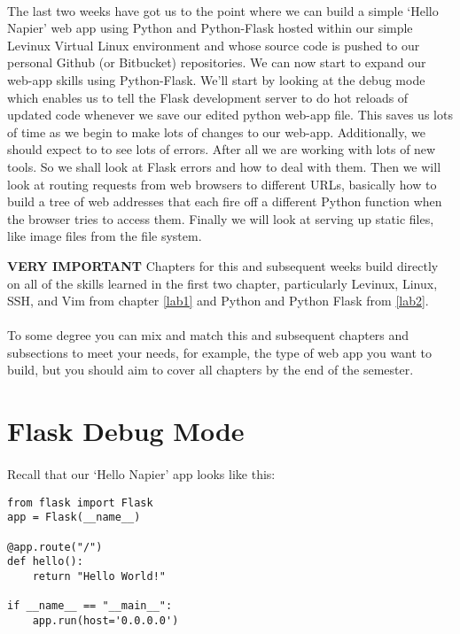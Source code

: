 \documentclass[12pt, a4paper, twoside]{book}
\begin{document}
\paragraph{} The last two weeks have got us to the point where we can build a simple `Hello Napier' web app using Python and Python-Flask hosted within our simple Levinux Virtual Linux environment and whose source code is pushed to our personal Github (or Bitbucket) repositories. We can now start to expand our web-app skills using Python-Flask. We'll start by looking at the debug mode which enables us to tell the Flask development server to do hot reloads of updated code whenever we save our edited python web-app file. This saves us lots of time as we begin to make lots of changes to our web-app. Additionally, we should expect to to see lots of errors. After all we are working with lots of new tools. So we shall look at Flask errors and how to deal with them. Then we will look at routing requests from web browsers to different URLs, basically how to build a tree of web addresses that each fire off a different Python function when the browser tries to access them. Finally we will look at serving up static files, like image files from the file system.

\begin{framed}
\textbf{VERY IMPORTANT} Chapters for this and subsequent weeks build directly on all of the skills learned in the first two chapter, particularly Levinux, Linux, SSH, and Vim from chapter \ref{lab1} and Python and Python Flask from \ref{lab2}.

\paragraph{} To some degree you can mix and match this and subsequent chapters and subsections to meet your needs, for example, the type of web app you want to build, but you should aim to cover all chapters by the end of the semester.
\end{framed}

\section{Flask Debug Mode}
\label{debug}
\paragraph{} Recall that our `Hello Napier' app looks like this:

\begin{lstlisting}
from flask import Flask
app = Flask(__name__)

@app.route("/")
def hello():
    return "Hello World!"

if __name__ == "__main__":
    app.run(host='0.0.0.0')
\end{lstlisting}
\end{document}
